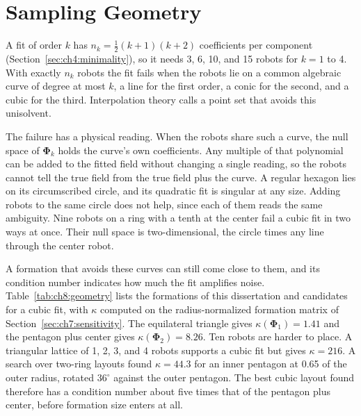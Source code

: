 \section{Sampling Geometry}
\label{sec:ch8:geometry}

A fit of order $k$ has $n_k = \tfrac{1}{2}(k+1)(k+2)$ coefficients per
component (Section~\ref{sec:ch4:minimality}), so it needs 3, 6, 10, and 15
robots for $k = 1$ to 4. With exactly $n_k$ robots the fit fails when the
robots lie on a common algebraic curve of degree at most $k$, a line for the
first order, a conic for the second, and a cubic for the third.
Interpolation theory calls a point set that avoids this unisolvent.

The failure has a physical reading. When the robots share such a curve,
the null space of $\boldsymbol{\Phi}_k$ holds the curve's own
coefficients. Any multiple of that polynomial can be added to the fitted
field without changing a single reading, so the robots cannot tell the
true field from the true field plus the curve. A regular hexagon lies on
its circumscribed circle, and its quadratic fit is singular at any size.
Adding robots to the same circle does not help, since each of them reads
the same ambiguity. Nine robots on a ring with a tenth at the center fail
a cubic fit in two ways at once. Their null space is two-dimensional,
the circle times any line through the center robot.

A formation that avoids these curves can still come close to them, and
its condition number indicates how much the fit amplifies noise.
Table~\ref{tab:ch8:geometry} lists the formations of this dissertation and
candidates for a cubic fit, with $\kappa$ computed on the
radius-normalized formation matrix of Section~\ref{sec:ch7:sensitivity}.
The equilateral triangle gives $\kappa(\boldsymbol{\Phi}_1) = 1.41$ and
the pentagon plus center gives $\kappa(\boldsymbol{\Phi}_2) = 8.26$. Ten
robots are harder to place. A triangular lattice of 1, 2, 3, and 4 robots
supports a cubic fit but gives $\kappa = 216$. A search over two-ring
layouts found $\kappa = 44.3$ for an inner pentagon at 0.65 of the outer
radius, rotated $36^\circ$ against the outer pentagon. The best cubic
layout found therefore has a condition number about five times that of
the pentagon plus center, before formation size enters at all.

